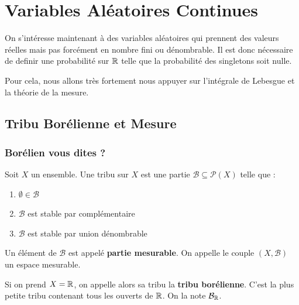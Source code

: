 \chapter{Variables Aléatoires Continues}

\justify

\setlength{\parindent}{0pt}
\renewcommand{\labelitemi}{\textbullet} %



On s'intéresse maintenant à des variables aléatoires qui prennent des valeurs réelles mais pas forcément en nombre fini ou dénombrable.
Il est donc nécessaire de definir une probabilité sur $\mathbb{R}$ telle que la probabilité des singletons soit nulle.

Pour cela, nous allons très fortement nous appuyer sur l'intégrale de Lebesgue et la théorie de la mesure. 


\section{Tribu Borélienne et Mesure}

\subsection{Borélien vous dites ?}

\begin{definition}[Tribu]
    Soit $X$ un ensemble. Une tribu sur $X$ est une partie $ \mathcal{B} \subseteq \mathcal{P}(X)$ telle que :
    \begin{enumerate}[label=\roman*)]
        \item $\emptyset \in \mathcal{B}$ 
        \item $ \mathcal{B}$ est stable par complémentaire 
        \item $ \mathcal{B}$ est stable par union dénombrable
    \end{enumerate}
    Un élément de $ \mathcal{B}$ est appelé \textbf{partie mesurable}. 
    On appelle le couple $(X, \mathcal{B})$ un espace mesurable. 
\end{definition}

\begin{remark}
    Si on prend $X = \mathbb{R}$, on appelle alors sa tribu la \textbf{tribu borélienne}. 
    C'est la plus petite tribu contenant tous les ouverts de $\mathbb{R}$. 
    On la note $ \mathcal{B}_{\mathbb{R}}$. 
\end{remark}


